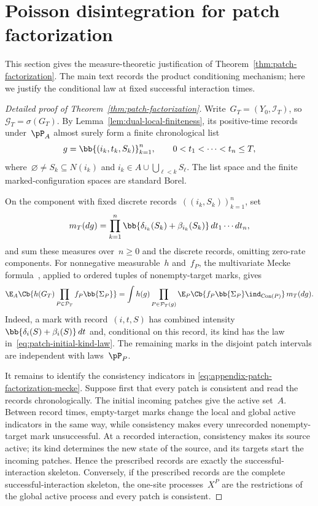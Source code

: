 \section{Poisson disintegration for patch factorization}
\label{app:patch-factorization-proof}

This section gives the measure-theoretic justification of
Theorem~\ref{thm:patch-factorization}. The main text records the product
conditioning mechanism; here we justify the conditional law at fixed successful
interaction times.

\begin{proof}[Detailed proof of Theorem~\ref{thm:patch-factorization}]
Write~$G_T=(Y_0,\mathcal I_T)$, so~$\mathcal G_T=\sigma(G_T)$. By
Lemma~\ref{lem:dual-local-finiteness}, its positive-time records under~$\pP_A$
almost surely form a finite chronological list
\begin{equation*}
g=\bb{(i_k,t_k,S_k)}_{k=1}^n,
\qquad
0<t_1<\cdots<t_n\leq T,
\end{equation*}
where~$\varnothing\neq S_k\subseteq N(i_k)$ and
$i_k\in A\cup\bigcup_{\ell<k}S_\ell$. The list space and the finite
marked-configuration spaces are standard Borel.

On the component with fixed discrete records~$((i_k,S_k))_{k=1}^n$, set
\begin{equation*}
m_T(dg)
=
\prod_{k=1}^n
\bb{\delta_{i_k}(S_k)+\beta_{i_k}(S_k)}
\,dt_1\cdots dt_n,
\end{equation*}
and sum these measures over~$n\geq0$ and the discrete records, omitting
zero-rate components. For nonnegative measurable~$h$ and~$f_P$, the
multivariate Mecke formula~\cite[Theorem~4.4]{LastPenrose2017}, applied to
ordered tuples of nonempty-target marks, gives
\begin{equation}
\label{eq:appendix-patch-factorization-mecke}
\E_A\Cb{
h(G_T)
\prod_{P\in\mathcal P_T}f_P\bb{\Sigma_P}
}
=
\int h(g)
\prod_{P\in\mathcal P_T(g)}
\E_P\Cb{
f_P\bb{\Sigma_P}\ind_{\operatorname{Con}(P)}
}
\,m_T(dg).
\end{equation}
Indeed, a mark with record~$(i,t,S)$ has combined intensity
$\bb{\delta_i(S)+\beta_i(S)}\,dt$ and, conditional on this record, its kind has
the law in~\eqref{eq:patch-initial-kind-law}. The remaining marks in the
disjoint patch intervals are independent with laws~$\pP_P$.

It remains to identify the consistency indicators in
\eqref{eq:appendix-patch-factorization-mecke}. Suppose first that every patch is
consistent and read the records chronologically. The initial incoming patches
give the active set~$A$. Between record times, empty-target marks change the
local and global active indicators in the same way, while consistency makes
every unrecorded nonempty-target mark unsuccessful. At a recorded interaction,
consistency makes its source active; its kind determines the new state of the
source, and its targets start the incoming patches. Hence the prescribed
records are exactly the successful-interaction skeleton. Conversely, if the
prescribed records are the complete successful-interaction skeleton, the
one-site processes~$X^P$ are the restrictions of the global active process and
every patch is consistent.


\end{proof}
